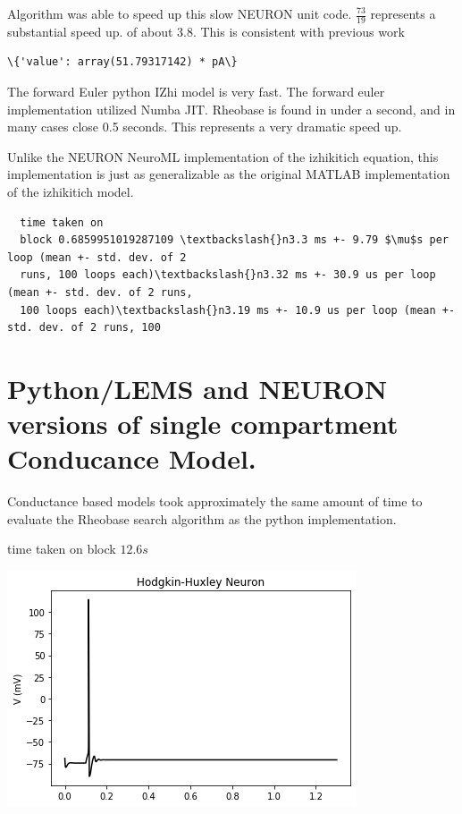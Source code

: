 Algorithm was able to speed up this slow NEURON unit code. $ \frac{73}{19} $ represents a substantial speed up. of about 3.8. This is consistent with previous work

\begin{verbatim}
\{'value': array(51.79317142) * pA\}
\end{verbatim}
        
    The forward Euler python IZhi model is very fast. The forward euler
implementation utilized Numba JIT. Rheobase is found in under a second,
and in many cases close 0.5 seconds. This represents a very dramatic
speed up.

Unlike the NEURON NeuroML implementation of the izhikitich equation,
this implementation is just as generalizable as the original MATLAB
implementation of the izhikitich model.


\begin{verbatim}
  time taken on
  block 0.6859951019287109 \textbackslash{}n3.3 ms +- 9.79 $\mu$s per loop (mean +- std. dev. of 2
  runs, 100 loops each)\textbackslash{}n3.32 ms +- 30.9 us per loop (mean +- std. dev. of 2 runs,
  100 loops each)\textbackslash{}n3.19 ms +- 10.9 us per loop (mean +- std. dev. of 2 runs, 100

\end{verbatim}
        
\section{Python/LEMS and NEURON versions of single compartment Conducance Model.}

Conductance based models took approximately the same amount of
time to evaluate the Rheobase search algorithm as the python
implementation.


time taken on block $ 12.6s $

\begin{center}
\includegraphics{figures/backend_check_files/backend_check_22_2}
\end{center}

